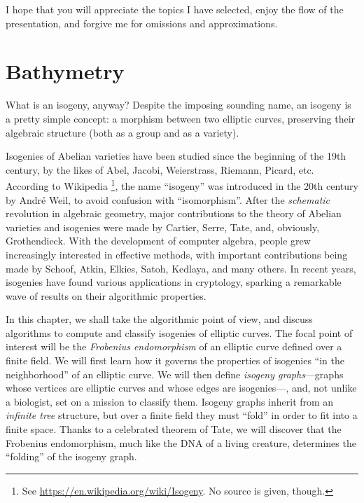 \documentclass{report}
\theoremstyle{plain}
\theoremstyle{definition}
\begin{document}
I hope that you will appreciate the topics I have selected, enjoy the
flow of the presentation, and forgive me for omissions and
approximations.


\chapter{Bathymetry}
\label{cha:tate}

What is an isogeny, anyway? %
Despite the imposing sounding name, an isogeny is a pretty simple
concept: a morphism between two elliptic curves, preserving their
algebraic structure (both as a group and as a variety). %

Isogenies of Abelian varieties have been studied since the beginning
of the 19th century, by the likes of Abel, Jacobi, Weierstrass,
Riemann, Picard, etc. %
According to Wikipedia%
\footnote{See \url{https://en.wikipedia.org/wiki/Isogeny}. No source
  is given, though.}, %
the name ``isogeny'' was introduced in the 20th century by André Weil,
to avoid confusion with ``isomorphism''. %
After the \emph{schematic} revolution in algebraic geometry, major
contributions to the theory of Abelian varieties and isogenies were
made by Cartier, Serre, Tate, and, obviously, Grothendieck. %
With the development of computer algebra, people grew increasingly
interested in effective methods, with important contributions being
made by Schoof, Atkin, Elkies, Satoh, Kedlaya, and many others. %
In recent years, isogenies have found various applications in
cryptology, sparking a remarkable wave of results on their algorithmic
properties. %

In this chapter, we shall take the algorithmic point of view, and
discuss algorithms to compute and classify isogenies of elliptic
curves. %
The focal point of interest will be the \emph{Frobenius endomorphism}
of an elliptic curve defined over a finite field. %
We will first learn how it governs the properties of isogenies ``in
the neighborhood'' of an elliptic curve. %
We will then define \emph{isogeny graphs}---graphs whose vertices are
elliptic curves and whose edges are isogenies---, and, not unlike a
biologist, set on a mission to classify them. %
Isogeny graphs inherit from an \emph{infinite tree} structure, but
over a finite field they must ``fold'' in order to fit into a finite
space. %
Thanks to a celebrated theorem of Tate, we will discover that the
Frobenius endomorphism, much like the DNA of a living creature,
determines the ``folding'' of the isogeny graph. %
\end{document}
